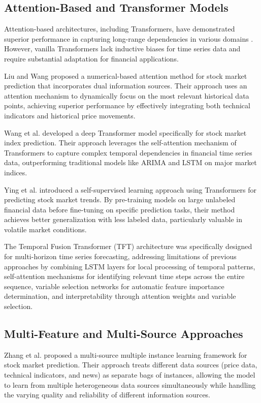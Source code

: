 \documentclass[conference]{IEEEtran}
\begin{document}
\subsection{Attention-Based and Transformer Models}
Attention-based architectures, including Transformers, have demonstrated superior performance in capturing long-range dependencies in various domains \cite{vaswani2017attention}. However, vanilla Transformers lack inductive biases for time series data and require substantial adaptation for financial applications.

Liu and Wang \cite{liu2019numerical} proposed a numerical-based attention method for stock market prediction that incorporates dual information sources. Their approach uses an attention mechanism to dynamically focus on the most relevant historical data points, achieving superior performance by effectively integrating both technical indicators and historical price movements.

Wang et al. \cite{wang2022stock} developed a deep Transformer model specifically for stock market index prediction. Their approach leverages the self-attention mechanism of Transformers to capture complex temporal dependencies in financial time series data, outperforming traditional models like ARIMA and LSTM on major market indices.

Ying et al. \cite{ying2024predicting} introduced a self-supervised learning approach using Transformers for predicting stock market trends. By pre-training models on large unlabeled financial data before fine-tuning on specific prediction tasks, their method achieves better generalization with less labeled data, particularly valuable in volatile market conditions.

The Temporal Fusion Transformer (TFT) architecture \cite{lim2021temporal} was specifically designed for multi-horizon time series forecasting, addressing limitations of previous approaches by combining LSTM layers for local processing of temporal patterns, self-attention mechanisms for identifying relevant time steps across the entire sequence, variable selection networks for automatic feature importance determination, and interpretability through attention weights and variable selection.

\subsection{Multi-Feature and Multi-Source Approaches}
Zhang et al. \cite{zhang2018stock} proposed a multi-source multiple instance learning framework for stock market prediction. Their approach treats different data sources (price data, technical indicators, and news) as separate bags of instances, allowing the model to learn from multiple heterogeneous data sources simultaneously while handling the varying quality and reliability of different information sources.
\end{document}
